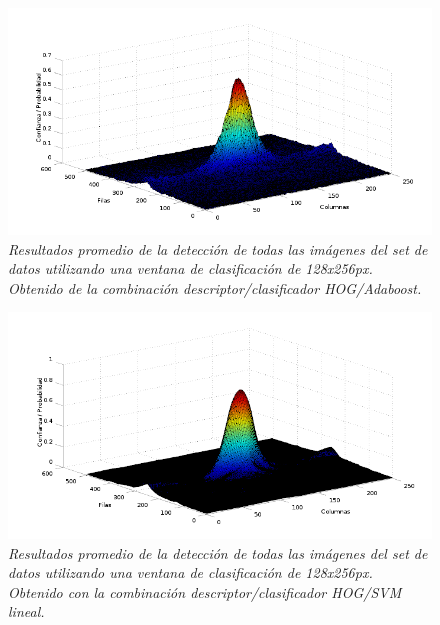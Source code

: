 \begin{figure}[htc]
  \centering
  \includegraphics[scale=.6]{images/mean/boost/128}
  \caption{\em  Resultados promedio de la detección de todas las imágenes del set de datos utilizando una ventana de clasificación de 128x256px. Obtenido de la combinación descriptor/clasificador HOG/Adaboost.}  
  \label{fig:gp5}
\end{figure}

\begin{figure}[htc]
  \centering
  \includegraphics[scale=.6]{images/mean/svm/128}
  \caption{\em  Resultados promedio de la detección de todas las imágenes del set de datos utilizando una ventana de clasificación de 128x256px. Obtenido con la combinación descriptor/clasificador HOG/SVM lineal.}  
  \label{fig:gp6}
\end{figure}

